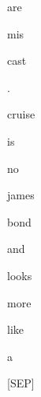 \documentclass[varwidth=150mm]{standalone}
\begin{document}
\begin{CJK*}{UTF8}{gbsn}
{{{\colorbox{red!2.3780319690704346}{\strut are} \colorbox{red!1.1088074445724487}{\strut mis}\colorbox{red!10.507057189941406}{\strut cast} \colorbox{red!0.0}{\strut .} \colorbox{red!1.575071096420288}{\strut cruise} \colorbox{red!6.317298889160156}{\strut is} \colorbox{red!1.4396767616271973}{\strut no} \colorbox{red!1.2502692937850952}{\strut james} \colorbox{red!22.66881561279297}{\strut bond} \colorbox{red!11.23997974395752}{\strut and} \colorbox{red!15.59647274017334}{\strut looks} \colorbox{red!4.800624370574951}{\strut more} \colorbox{red!1.0551822185516357}{\strut like} \colorbox{red!10.876611709594727}{\strut a} \colorbox{red!4.828964710235596}{\strut [SEP]}
}}}
\end{CJK*}
\end{document}
